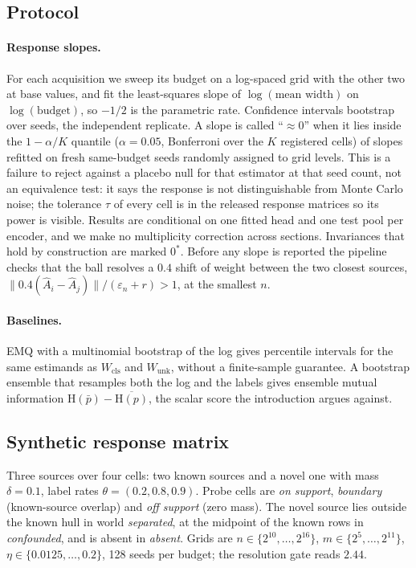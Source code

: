 \documentclass[twoside]{article}
\newcommand{\Wcls}{\ensuremath{W_{\mathrm{cls}}}}
\newcommand{\Wunk}{\ensuremath{W_{\mathrm{unk}}}}
\begin{document}
\subsection{Protocol}
\label{sec:exp-protocol}

\paragraph{Response slopes.} For each acquisition we sweep its budget on a log-spaced grid with the
other two at base values, and fit the least-squares slope of $\log(\text{mean width})$ on
$\log(\text{budget})$, so $-1/2$ is the parametric rate. Confidence intervals bootstrap over seeds,
the independent replicate. A slope is called ``$\approx0$'' when it lies inside the
$1-\alpha/K$ quantile ($\alpha=0.05$, Bonferroni over the $K$ registered cells) of slopes refitted
on fresh same-budget seeds randomly assigned to grid levels. This is a failure to reject against a
placebo null for that estimator at that seed count, not an equivalence test: it says the response is
not distinguishable from Monte Carlo noise; the tolerance $\tau$ of every cell is in the released
response matrices so its power is visible. Results are conditional on one fitted head and one test pool
per encoder, and we make no multiplicity correction across sections.
Invariances that hold by construction are marked $0^{\ast}$. Before any slope is reported the pipeline checks that the ball resolves a $0.4$
shift of weight between the two closest sources, $\lVert0.4(\hat A_i-\hat A_j)\rVert/(\varepsilon_n+r)>1$,
at the smallest $n$.

\paragraph{Baselines.} EMQ \citep{saerens2002adjusting} with a multinomial bootstrap of the log gives
percentile intervals for the same estimands as $\Wcls$ and $\Wunk$, without a finite-sample guarantee.
A bootstrap ensemble that resamples both the log and the labels gives ensemble mutual information
$\mathrm H(\bar p)-\overline{\mathrm H(p)}$, the scalar score the introduction argues against.

\subsection{Synthetic response matrix}
\label{sec:exp-synthetic}

Three sources over four cells: two known sources and a novel one with mass $\delta=0.1$, label rates
$\theta=(0.2,0.8,0.9)$. Probe cells are \emph{on support}, \emph{boundary} (known-source overlap) and
\emph{off support} (zero mass). The novel source lies outside the known hull in world
\emph{separated}, at the midpoint of the known rows in \emph{confounded}, and is absent in
\emph{absent}. Grids are $n\in\{2^{10},\dots,2^{16}\}$, $m\in\{2^5,\dots,2^{11}\}$,
$\eta\in\{0.0125,\dots,0.2\}$, 128 seeds per budget; the resolution gate reads $2.44$.
\end{document}
